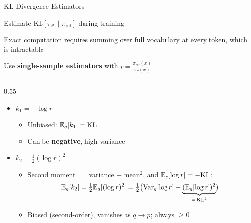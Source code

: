 \begin{frame}{KL Divergence Estimators}
  \begin{description}[leftmargin=1.8cm, labelwidth=1.6cm, nosep]
    \item[Goal] Estimate $\text{KL}[\pi_\theta \| \pi_\text{ref}]$ during training
    \item[Problem] Exact computation requires summing over full vocabulary at every token, which is intractable
    \item[Solution] Use \textbf{single-sample estimators} with $r = \frac{\pi_\text{ref}(x)}{\pi_\theta(x)}$
  \end{description}

  \vspace{0.2em}
  \begin{columns}[T]
    \begin{column}{0.55\textwidth}
      \begin{itemize}[nosep]
        \item $k_1 = -\log r$
          \begin{itemize}[nosep]
            \item Unbiased: $\mathbb{E}_q[k_1] = \text{KL}$
            \item Can be \textbf{negative}, high variance
          \end{itemize}

        \item $k_2 = \tfrac{1}{2}(\log r)^2$
          \begin{itemize}[nosep]
            \item Second moment $=$ variance $+$ mean$^2$, and $\mathbb{E}_q[\log r] = -\text{KL}$:
              \vspace{-0.4em}
              \[
                \mathbb{E}_q[k_2] = \tfrac{1}{2}\mathbb{E}_q[(\log r)^2]
                = \tfrac{1}{2}\bigl(\text{Var}_q[\log r] + \underbrace{(\mathbb{E}_q[\log r])^2}_{=\,\text{KL}^2}\bigr)
              \]
              \vspace{-1.5em}
            \item Biased (second-order), vanishes as $q \to p$; always $\geq 0$
          \end{itemize}


\end{itemize}
\end{column}
\end{columns}
\end{frame}
